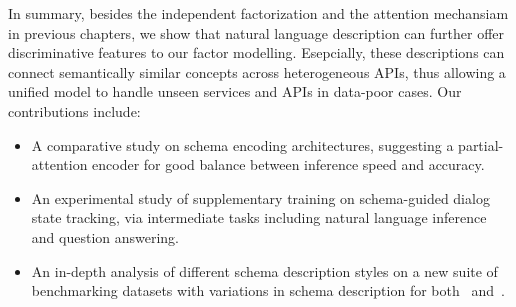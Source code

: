 In summary, besides the independent factorization and the attention
mechansiam in previous chapters, we show that natural language
description can further offer discriminative features to our factor
modelling. Esepcially, these descriptions can connect semantically
similar concepts across heterogeneous APIs, thus allowing a unified
model to handle unseen services and APIs in data-poor cases. Our
contributions include:
\begin{itemize}
\item A comparative study
  on schema encoding architectures, suggesting a partial-attention
  encoder for good balance between inference speed and accuracy.
\item An experimental study of supplementary training on
  schema-guided dialog state tracking, via intermediate tasks
  including natural language inference and question answering.
\item An in-depth analysis of different schema description styles on a new
  suite of benchmarking datasets with
  variations in schema description for both \sgdst~and~\multiwoz.
\end{itemize}
















